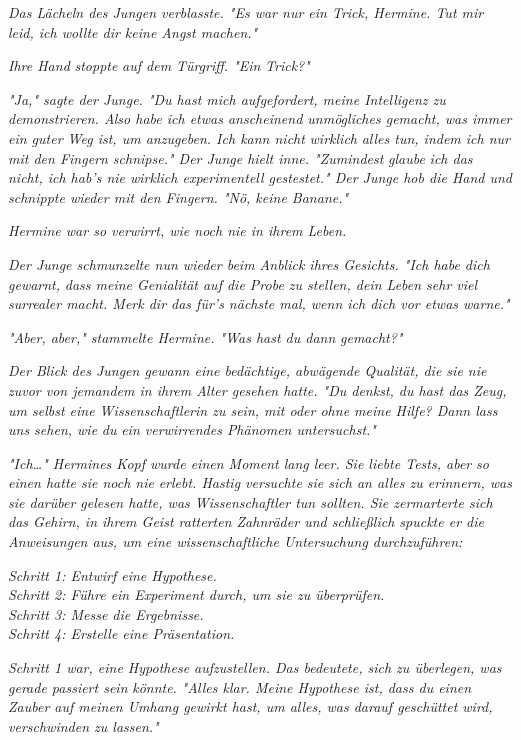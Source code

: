 {\emph{Das Lächeln des Jungen verblasste. "Es war nur ein Trick, Hermine. Tut mir leid, ich wollte dir keine Angst machen."}

\emph{Ihre Hand} \emph{stoppte} \emph{auf dem Türgriff. "Ein} \emph{\emph{Trick?}"}

\emph{"Ja," sagte der Junge. "Du hast mich aufgefordert, meine Intelligenz zu demonstrieren. Also habe ich etwas anscheinend unmögliches gemacht, was immer ein guter Weg ist, um anzugeben. Ich kann nicht} \emph{\emph{wirklich}} \emph{alles tun, indem ich nur mit den Fingern schnipse." Der Junge hielt inne. "Zumindest} \emph{\emph{glaube}} \emph{ich das nicht, ich hab's nie wirklich experimentell gestestet." Der Junge hob die Hand und schnippte wieder mit den Fingern. "Nö, keine Banane."}

\emph{Hermine war so verwirrt, wie noch nie in ihrem Leben.}

\emph{Der Junge schmunzelte nun wieder beim Anblick ihres Gesichts. "Ich habe dich} \emph{\emph{gewarnt,}} \emph{dass meine Genialität auf die Probe zu stellen, dein Leben sehr viel surrealer macht. Merk dir das für's nächste mal, wenn ich dich vor etwas warne."}

\emph{"Aber, aber," stammelte Hermine. "Was hast du dann} \emph{\emph{gemacht?}"}

\emph{Der Blick des Jungen gewann eine bedächtige, abwägende Qualität, die sie nie zuvor von jemandem in ihrem Alter gesehen hatte. "Du denkst, du hast das Zeug, um selbst eine Wissenschaftlerin zu sein, mit oder ohne meine Hilfe? Dann lass uns sehen, wie} \emph{\emph{du}} \emph{ein verwirrendes Phänomen untersuchst."}

\emph{"Ich…" Hermines Kopf wurde einen Moment lang leer. Sie liebte Tests, aber} \emph{\emph{so}} \emph{einen hatte sie noch nie} \emph{erlebt. Hastig versuchte sie sich an alles zu erinnern, was sie darüber gelesen hatte, was Wissenschaftler tun sollten. Sie zermarterte sich das Gehirn, in ihrem Geist ratterten Zahnräder und schließlich spuckte er die Anweisungen aus, um eine wissenschaftliche Untersuchung durchzuführen:}

\emph{Schritt 1: Entwirf eine Hypothese.\\ Schritt 2: Führe ein Experiment durch, um sie zu überprüfen.\\ Schritt 3: Messe die Ergebnisse.\\ Schritt 4: Erstelle eine Präsentation.}

\emph{Schritt 1 war, eine Hypothese aufzustellen. Das bedeutete, sich zu überlegen, was gerade passiert sein} \emph{\emph{könnte.}} \emph{"Alles klar. Meine Hypothese ist, dass du einen Zauber auf meinen Umhang gewirkt hast, um alles, was darauf geschüttet wird, verschwinden zu lassen."}

}
